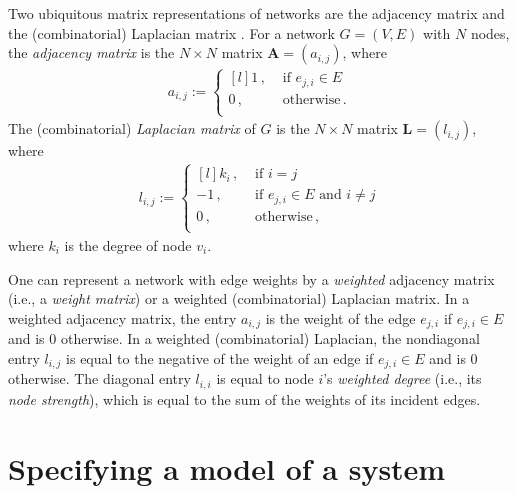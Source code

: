 \documentclass{comnet-mod}
\begin{document}
Two ubiquitous matrix representations of networks are the adjacency matrix and the (combinatorial) Laplacian matrix \cite[p.\,142]{Newman2018}. For a network $G=(V,E)$ with $N$ nodes, the \textit{adjacency matrix} is the $N \times N$ matrix $\mathbf A=(a_{i,j})$, where \cite[p.\,110]{Newman2018}
\begin{align}
	a_{i,j} := \left\{\begin{matrix*}[l]
		1\,,&\textrm{ if $e_{j,i}\in E$}\\
		0\,,&\textrm{ otherwise}\,.\\
\end{matrix*}\right.\label{eq:adjacency_matrix}
\end{align}
The (combinatorial) \textit{Laplacian matrix} of $G$ is the $N\times N$ matrix $\mathbf L=(l_{i,j})$, where \cite[p.\,142]{Newman2018}
\begin{align}
	l_{i,j} := \left\{\begin{matrix*}[l]
		k_i\,,&\textrm{ if $i=j$}\\
		-1\,,&\textrm{ if $e_{j,i}\in E$ and $i\neq j$}\\
		0\,,&\textrm{ otherwise}\,,\\
\end{matrix*}\right.\nonumber
\end{align}
where $k_i$ is the degree of node $v_i$. 

One can represent a network with edge weights by a \textit{weighted} adjacency matrix (i.e., a \emph{weight matrix}) or a weighted (combinatorial) Laplacian matrix. In a weighted adjacency matrix, the entry $a_{i,j}$ is the weight of the edge $e_{j,i}$ if $e_{j,i}\in E$ and is $0$ otherwise. In a weighted (combinatorial) Laplacian, the nondiagonal entry $l_{i,j}$ is equal to the negative of the weight of an edge if $e_{j,i}\in E$ and is $0$ otherwise. The diagonal entry $l_{i,i}$ is equal to node $i$'s \textit{weighted degree} (i.e., its \textit{node strength}), which is equal to the sum of the weights of its incident edges.



\section{Specifying a model of a system} \label{sec:models}
\end{document}
